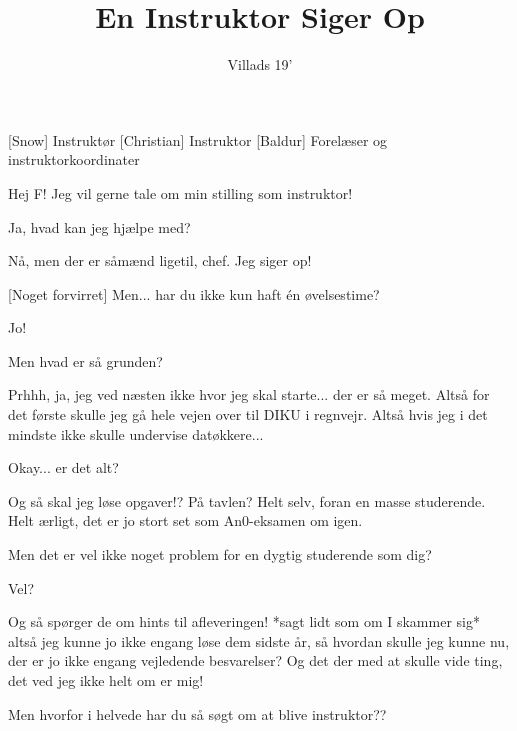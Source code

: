 \documentclass[a4paper,11pt]{article}
\title{En Instruktor Siger Op}
\author{Villads 19'}
\begin{document}
\maketitle

\begin{roles}
[Snow] Instruktør
[Christian] Instruktor
[Baldur] Forelæser og instruktorkoordinater
\end{roles}

\begin{sketch}

 Hej F! Jeg vil gerne tale om min stilling som instruktor!

 Ja, hvad kan jeg hjælpe med? 

 Nå, men der er såmænd ligetil, chef. Jeg siger op!

[Noget forvirret] Men... har du ikke kun haft  én øvelsestime?


 Jo!

 Men hvad er så grunden?

 Prhhh, ja, jeg ved næsten ikke hvor jeg skal starte... der er så meget. Altså for det første skulle jeg gå hele vejen over til DIKU i regnvejr. Altså hvis jeg i det mindste ikke skulle undervise datøkkere... 


 Okay... er det alt?

 Og så skal jeg løse opgaver!? På tavlen? Helt selv, foran en masse studerende. Helt ærligt, det er jo stort set som An0-eksamen om igen.

 Men det er vel ikke noget problem for en dygtig studerende som dig?


 Vel?


 Og så spørger de om hints til afleveringen! *sagt lidt som om I skammer sig* altså jeg kunne jo ikke engang løse dem sidste år, så hvordan skulle jeg kunne nu, der er jo ikke engang vejledende besvarelser? Og det der med at skulle vide ting, det ved jeg ikke helt om er mig!


 Men hvorfor i helvede har du så søgt om at blive instruktor?? 


\end{sketch}
\end{document}
